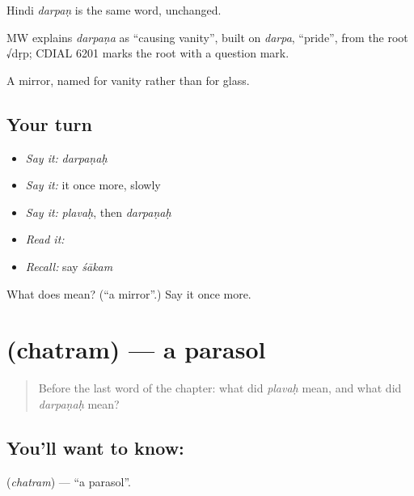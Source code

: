 Hindi \emph{darpaṇ} is the same word, unchanged.

\begin{cousinweb}
MW explains \emph{darpaṇa} as \textquotedblleft{}causing vanity\textquotedblright{}, built on \emph{darpa}, \textquotedblleft{}pride\textquotedblright{}, from the root √dṛp; CDIAL 6201 marks the root with a question mark.
\end{cousinweb}

\begin{grammarlens}[title={What you've built}]
A mirror, named for vanity rather than for glass.
\end{grammarlens}

\subsection*{Your turn}
\begin{itemize}
\raggedright
  \item \emph{Say it:} \emph{darpaṇaḥ}
  \item \emph{Say it:} it once more, slowly
  \item \emph{Say it:} \emph{plavaḥ}, then \emph{darpaṇaḥ}
  \item \emph{Read it:} \textbf{}
  \item \emph{Recall:} say \emph{śākam}
\end{itemize}

\begin{tcolorbox}[breakable,colback=teal!4,colframe=teal!35!black,title={Before you move on}]
What does  mean? (\textquotedblleft{}a mirror\textquotedblright{}.) Say it once more.
\end{tcolorbox}
\section[\texorpdfstring{\sk{छत्रम्} (chatram)}{छत्रम् (chatram)}]{ (chatram) — a parasol}

\label{lesson:SA-C41-parasol}



\begin{quote}
Before the last word of the chapter: what did \emph{plavaḥ} mean, and what did \emph{darpaṇaḥ} mean?
\end{quote}

\subsection*{You'll want to know: }
\textbf{} (\emph{chatram}) — \textquotedblleft{}a parasol\textquotedblright{}.

